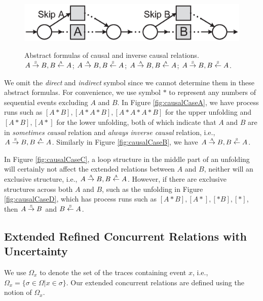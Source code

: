 \documentclass{llncs}
\begin{document}
\begin{figure}[htbp]
{\begin{minipage}[b]{0.45\textwidth}
		\centering
		\includegraphics[width=1.0\textwidth]{fig_causal_case_d}
	\end{minipage}
	\label{fig:causalCaseD}
}
\caption{Abstract formulas of causal and inverse causal relations.  $A\overset{\text{\tiny{S}}}{\rightarrow} B, B\overset{\text{\tiny{A}}}{\leftarrow} A$;  $A\overset{\text{\tiny{A}}}{\rightarrow} B, B\overset{\text{\tiny{S}}}{\leftarrow} A$;  $A\overset{\text{\tiny{A}}}{\rightarrow} B, B\overset{\text{\tiny{A}}}{\leftarrow} A$;  $A\overset{\text{\tiny{S}}}{\rightarrow} B, B\overset{\text{\tiny{S}}}{\leftarrow} A$.\label{fig:causalCases}}
\end{figure}

We omit the \textit{direct} and \textit{indirect} symbol since we cannot determine them in these abstract formulas. For convenience, we use symbol $*$ to represent any numbers of sequential events excluding $A$ and $B$. In Figure \ref{fig:causalCaseA}, we have process runs such as $[A*B],[A*A*B],[A*A*A*B]$ for the upper unfolding and $[A*B],[A*]$ for the lower unfolding, both of which indicate that $A$ and $B$ are in \textit{sometimes causal} relation and \textit{always inverse causal} relation, i.e., $A\overset{\text{\tiny{S}}}{\rightarrow} B,B\overset{\text{\tiny{A}}}{\leftarrow} A$. Similarly in Figure \ref{fig:causalCaseB}, we have $A\overset{\text{\tiny{A}}}{\rightarrow} B,B\overset{\text{\tiny{S}}}{\leftarrow} A$.

In Figure \ref{fig:causalCaseC}, a loop structure in the middle part of an unfolding will certainly not affect the extended relations between $A$ and $B$, neither will an exclusive structure, i.e., $A\overset{\text{\tiny{A}}}{\rightarrow} B,B\overset{\text{\tiny{A}}}{\leftarrow} A$. However, if there are exclusive structures across both $A$ and $B$, such as the unfolding in Figure \ref{fig:causalCaseD}, which has process runs such as $[A*B],[A*],[*B],[*]$, then $A\overset{\text{\tiny{S}}}{\rightarrow} B$ and $B\overset{\text{\tiny{S}}}{\leftarrow} A$.

\subsection{Extended Refined Concurrent Relations with Uncertainty}\label{subsec:concurrent}
We use $\Omega_{x}$ to denote the set of the traces containing event $x$, i.e., $\Omega_{x}=\{\sigma\in\Omega|x\in\sigma\}$. Our extended concurrent relations are defined using the notion of $\Omega_{x}$.
\end{document}
